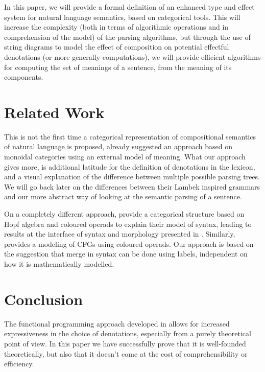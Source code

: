 \documentclass[a4paper,UKenglish,cleveref, autoref, thm-restate]{lipics-v2021}
\begin{document}
\smallskip

In this paper, we will provide a formal definition of an enhanced type and
effect system for natural language semantics, based on categorical tools.
This will increase the complexity (both in terms of algorithmic operations and
in comprehension of the model) of the parsing algorithms, but through the use
of string diagrams to model the effect of composition on potential effectful
denotations (or more generally computations), we will provide efficient
algorithms for computing the set of meanings of a sentence, from the meaning of
its components.

\section{Related Work}
This is not the first time a categorical representation of compositional
semantics of natural language is proposed,
\cite{coeckeMathematicalFoundationsCompositional2010} already suggested an
approach based on monoidal categories using an external model of meaning.
What our approach gives more, is additional latitude for the definition of
denotations in the lexicon, and a visual explanation of the difference between
multiple possible parsing trees.
We will go back later on the differences between their Lambek inspired grammars
and our more abstract way of looking at the semantic parsing of a sentence.

\smallskip

On a completely different approach,
\cite{marcollimatildeetchomskynoametberwickrobertc.MathematicalStructureSyntactic}
provide a categorical structure based on Hopf algebra and coloured operads
to explain their model of syntax, leading to results at the interface of syntax
and morphology presented in \cite{senturiaAlgebraicStructureMorphosyntax2025}.
Similarly, \cite{melliesCategoricalContoursChomskySchutzenberger2025} provides
a modeling of CFGs using coloured operads.
Our approach is based on the suggestion that merge in syntax can be done using
labels, independent on how it is mathematically modelled.







\section{Conclusion}
The functional programming approach developed in
\cite{bumfordEffectdrivenInterpretationFunctors2025} allows for increased
expressiveness in the choice of denotations, especially from a purely
theoretical point of view.
In this paper we have successfully prove that it is well-founded theoretically,
but also that it doesn't come at the cost of comprehensibility or efficiency.
\end{document}
